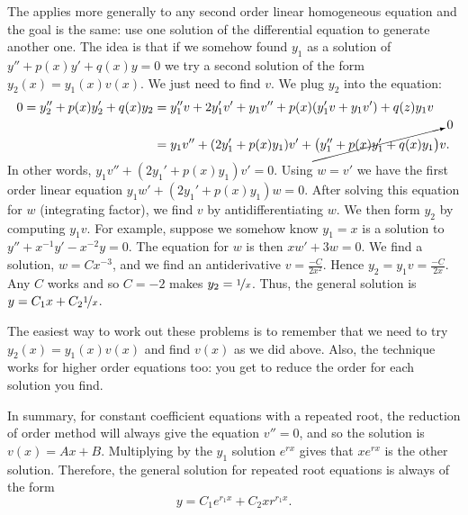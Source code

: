 The \emph{} applies more generally to any second order linear homogeneous equation and the goal is the same: use one solution of the differential equation to generate another one.  The idea is that if we somehow found $y_1$ as a solution of
$y'' + p(x) y' + q(x) y = 0$ we try a second
solution of the form $y_2(x) = y_1(x) v(x)$.
We just need to find $v$.  We plug $y_2$ into the equation:
\begin{equation*}
\begin{split}
0 = 
y_2'' + p(x) y_2' + q(x) y_2 & =
y_1'' v + 2 y_1' v' + y_1 v''
+ p(x) ( y_1' v + y_1 v' )
+ q(z) y_1 v
\\
& =
y_1 v''
+ (2 y_1' + p(x) y_1) v'
+
\cancelto{0}{\bigl( y_1'' + p(x) y_1' + q(x) y_1 \bigr)} v .
\end{split}
\end{equation*}
In other words,
$y_1 v'' + (2 y_1' + p(x) y_1) v' = 0$.  Using $w = v'$ we have the
first order linear equation
$y_1 w' + (2 y_1' + p(x) y_1) w = 0$.  After solving this equation for $w$
(integrating factor),
we find $v$ by antidifferentiating $w$.  We then form $y_2$ by computing
$y_1 v$.  For example, suppose we somehow know $y_1 = x$ is a solution
to $y''+x^{-1}y'-x^{-2} y=0$.
The equation for $w$ is then
$xw' + 3 w = 0$.  We find a solution, $w = Cx^{-3}$, and we find an 
antiderivative $v = \frac{-C}{2x^2}$.
Hence $y_2 = y_1 v = \frac{-C}{2x}$.
Any $C$ works and so $C=-2$ makes $y_2 = \nicefrac{1}{x}$.  Thus, the
general solution is $y = C_1 x + C_2\nicefrac{1}{x}$.

The easiest way to work out these problems is to remember that we need to try $y_2(x) =
y_1(x) v(x)$ and find $v(x)$ as we did above.  Also, the technique
works for higher order equations too: you get to reduce the order for each
solution you find. 

In summary, for constant coefficient equations with a repeated root, the reduction of order method will always give the equation $v'' = 0$, and so the solution is $v(x) = Ax + B$. Multiplying by the $y_1$ solution $e^{rx}$ gives that $xe^{rx}$ is the other solution. Therefore, the general solution for repeated root equations is always of the form
\begin{equation*}
y = C_1e^{r_1x} + C_2xr^{r_1x}.
\end{equation*}


